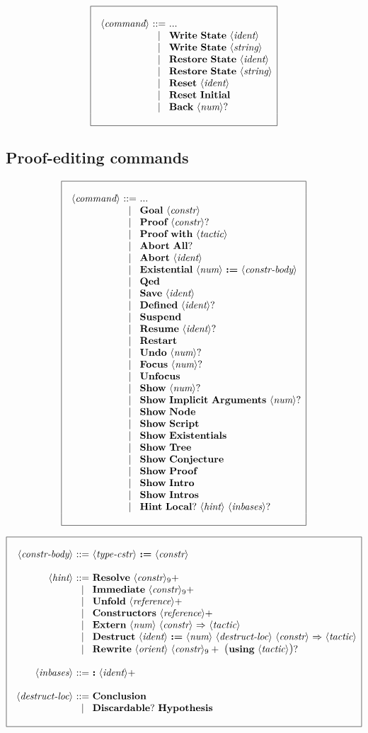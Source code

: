 \documentclass{article}
\makeatletter
\def\GR#1{\text{\large(}#1\text{\large)}}
\def\NT#1{\langle\textit{#1}\rangle}
\def\NTL#1#2{\langle\textit{#1}\rangle_{#2}}
\def\TERM#1{{\bf\textrm{\bf #1}}}
\def\KWD#1{\TERM{#1}}
\def\PLUS#1{#1+}
\def\OPT#1{#1?}
\def\OPTGR#1{\GR{#1}?}
\newenvironment{cadre}
        {\begin{array}{|c|}\hline\\}
        {\\\\\hline\end{array}}
\newenvironment{rulebox}
        {$$\begin{cadre}\begin{array}{r@{~}c@{~}l@{}l@{}r}}
        {\end{array}\end{cadre}$$}
\def\DEFNT#1{\NT{#1} & ::= &}
\def\EXTNT#1{\NT{#1} & ::= & ... \\&|&}
\def\SEPDEF{\\\\}
\def\nlsep{\\&|&}
\newenvironment{rules}
        {\begin{center}\begin{rulebox}}
        {\end{rulebox}\end{center}}
\makeatother
\begin{document}
\begin{rules}
\EXTNT{command}
       \TERM{Write}~\TERM{State}~\NT{ident}
\nlsep \TERM{Write}~\TERM{State}~\NT{string}
\nlsep \TERM{Restore}~\TERM{State}~\NT{ident}
\nlsep \TERM{Restore}~\TERM{State}~\NT{string}
\nlsep \TERM{Reset}~\NT{ident}
\nlsep \TERM{Reset}~\TERM{Initial}
\nlsep \TERM{Back}~\OPT{\NT{num}}
\end{rules}

\subsection{Proof-editing commands}

\begin{rules}
\EXTNT{command}
       \TERM{Goal}~\NT{constr}
\nlsep \TERM{Proof}~\OPT{\NT{constr}}
\nlsep \TERM{Proof}~\KWD{with}~\NT{tactic}
\nlsep \TERM{Abort}~\OPT{\TERM{All}}
\nlsep \TERM{Abort}~\NT{ident}
\nlsep \TERM{Existential}~\NT{num}~\KWD{:=}~\NT{constr-body}
\nlsep \TERM{Qed}
\nlsep \TERM{Save}~\NT{ident}
\nlsep \TERM{Defined}~\OPT{\NT{ident}}
\nlsep \TERM{Suspend}
\nlsep \TERM{Resume}~\OPT{\NT{ident}}
\nlsep \TERM{Restart}
\nlsep \TERM{Undo}~\OPT{\NT{num}}
\nlsep \TERM{Focus}~\OPT{\NT{num}}
\nlsep \TERM{Unfocus}
\nlsep \TERM{Show}~\OPT{\NT{num}}
\nlsep \TERM{Show}~\TERM{Implicit}~\TERM{Arguments}~\OPT{\NT{num}}
\nlsep \TERM{Show}~\TERM{Node}
\nlsep \TERM{Show}~\TERM{Script}
\nlsep \TERM{Show}~\TERM{Existentials}
\nlsep \TERM{Show}~\TERM{Tree}
\nlsep \TERM{Show}~\TERM{Conjecture}
\nlsep \TERM{Show}~\TERM{Proof}
\nlsep \TERM{Show}~\TERM{Intro}
\nlsep \TERM{Show}~\TERM{Intros}
\nlsep \TERM{Hint}~\OPT{\TERM{Local}}~\NT{hint}~\OPT{\NT{inbases}}
\end{rules}


\begin{rules}
\DEFNT{constr-body}
       \NT{type-cstr}~\KWD{:=}~\NT{constr}
\SEPDEF
\DEFNT{hint}
       \TERM{Resolve}~\PLUS{\NTL{constr}{9}}
\nlsep \TERM{Immediate}~\PLUS{\NTL{constr}{9}}
\nlsep \TERM{Unfold}~\PLUS{\NT{reference}}
\nlsep \TERM{Constructors}~\PLUS{\NT{reference}}
\nlsep \TERM{Extern}~\NT{num}~\NT{constr}~\KWD{$\Rightarrow$}~\NT{tactic}
\nlsep \TERM{Destruct}~\NT{ident}~\KWD{:=}~\NT{num}~\NT{destruct-loc}
       ~\NT{constr}~\KWD{$\Rightarrow$}~\NT{tactic}
\nlsep \TERM{Rewrite}~\NT{orient}~\PLUS{\NTL{constr}{9}}
       ~\OPTGR{\KWD{using}~\NT{tactic}}
\SEPDEF
\DEFNT{inbases}
       \KWD{:}~\PLUS{\NT{ident}}
\SEPDEF
\DEFNT{destruct-loc}
       \TERM{Conclusion}
\nlsep \OPT{\TERM{Discardable}}~\TERM{Hypothesis}
\end{rules}
\end{document}
